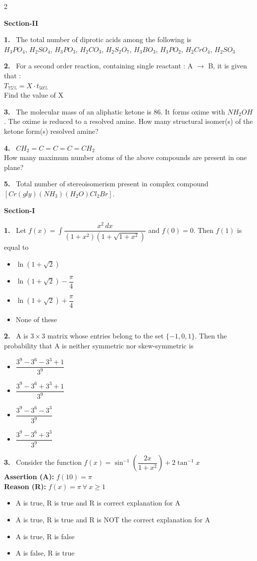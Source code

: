 \documentclass[10pt]{extarticle}
\newcommand{\partsec}[2]{\par\medskip\noindent{\large\bfseries PART-#1: #2}\par\smallskip}
\newcommand{\sect}[1]{\par\smallskip\noindent\textbf{#1}\par}
\newcommand{\qn}[1]{\par\smallskip\noindent\textbf{#1.}~}
\newenvironment{qoptions}{\begin{itemize}[leftmargin=1.8em,itemsep=1pt,topsep=2pt,label={}]}{\end{itemize}}
\newcommand{\opt}[2]{\item[(#1)] #2}
\begin{document}
\begin{multicols}{2}
\sect{Section-II}

\qn{1} The total number of diprotic acids among the following is\\
$H_3PO_4$, $H_2SO_4$, $H_3PO_3$, $H_2CO_3$, $H_2S_2O_7$, $H_3BO_3$, $H_3PO_2$, $H_2CrO_4$, $H_2SO_3$

\qn{2} For a second order reaction, containing single reactant : A $\to$ B, it is given that :\\
$T_{75\%}=X\cdot t_{50\%}$\\
Find the value of X

\qn{3} The molecular mass of an aliphatic ketone is 86. It forms oxime with $NH_2OH$. The oxime is reduced to a resolved amine. How many structural isomer(s) of the ketone form(s) resolved amine?

\qn{4} $CH_2=C=C=C=CH_2$\\
How many maximum number atoms of the above compounds are present in one plane?

\qn{5} Total number of stereoisomerism present in complex compound $[Cr(gly)(NH_3)(H_2O)Cl_2Br]$.

\partsec{3}{MATHEMATICS}
\sect{Section-I}

\qn{1} Let $f(x)=\displaystyle\int \dfrac{x^2\,dx}{(1+x^2)\left(1+\sqrt{1+x^2}\right)}$ and $f(0)=0$. Then $f(1)$ is equal to
\begin{qoptions}
\opt{A}{$\ln\left(1+\sqrt2\right)$}
\opt{B}{$\ln\left(1+\sqrt2\right)-\dfrac{\pi}{4}$}
\opt{C}{$\ln\left(1+\sqrt2\right)+\dfrac{\pi}{4}$}
\opt{D}{None of these}
\end{qoptions}

\qn{2} A is $3\times3$ matrix whose entries belong to the set $\{-1,0,1\}$. Then the probability that A is neither symmetric nor skew-symmetric is
\begin{qoptions}
\opt{A}{$\dfrac{3^9-3^6-3^3+1}{3^9}$}
\opt{B}{$\dfrac{3^9-3^6+3^3+1}{3^9}$}
\opt{C}{$\dfrac{3^9-3^6-3^3}{3^9}$}
\opt{D}{$\dfrac{3^9-3^6+3^3}{3^9}$}
\end{qoptions}

\qn{3} Consider the function $f(x)=\sin^{-1}\left(\dfrac{2x}{1+x^2}\right)+2\tan^{-1}x$\\
\textbf{Assertion (A):} $f(10)=\pi$\\
\textbf{Reason (R):} $f(x)=\pi\ \forall\ x\ge1$
\begin{qoptions}
\opt{A}{A is true, R is true and R is correct explanation for A}
\opt{B}{A is true, R is true and R is NOT the correct explanation for A}
\opt{C}{A is true, R is false}
\opt{D}{A is false, R is true}
\end{qoptions}


\end{multicols}
\end{document}

